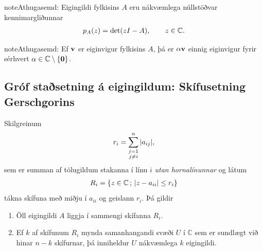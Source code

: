 \documentclass[letterpaper,10pt,icelandic]{sphinxmanual}
\begin{document}
\begin{notice}{note}{Athugasemd:}
Eigingildi fylkisins \(A\) eru nákvæmlega núllstöðvar
kennimargliðunnar
\begin{gather}
\begin{split}p_A(z)=\det(zI-A), \qquad z\in {{\mathbb  C}}.\end{split}\notag
\end{gather}\end{notice}

\begin{notice}{note}{Athugasemd:}
Ef \({\mbox{${\bf v}$}}\) er eiginvigur fylkisins
\(A\), þá er \(\alpha {\mbox{${\bf v}$}}\) einnig eiginvigur
fyrir sérhvert
\(\alpha\in {{\mathbb  C}}\setminus \{{\mbox{${\bf 0}$}}\}\).
\end{notice}


\subsection{Gróf staðsetning á eigingildum: Skífusetning Gerschgorins}
\label{kafli09:index-1}\label{kafli09:grof-stasetning-a-eigingildum-skifusetning-gerschgorins}
Skilgreinum
\begin{gather}
\begin{split}r_i=\sum\limits_{{\substack{j=1 \\ j\neq i}}}^n|a_{ij}|,\end{split}\notag
\end{gather}
sem er summan af tölugildum stakanna í línu \(i\) \emph{utan
hornalínunnar} og látum
\begin{gather}
\begin{split}R_i=\{z\in {{\mathbb  C}}\,;\, |z-a_{ii}|\leq r_i\}\end{split}\notag
\end{gather}
tákna skífuna með miðju í \(a_{ii}\) og geislann \(r_i\). Þá
gildir
\begin{enumerate}
\item {} 
Öll eigingildi \(A\) liggja í sammengi skífanna \(R_i\).

\item {} 
Ef \(k\) af skífunum \(R_i\) mynda samanhangandi svæði
\(U\) í \({{\mathbb  C}}\) sem er sundlægt við hinar
\(n-k\) skífurnar, þá inniheldur \(U\) nákvæmlega \(k\)
eigingildi.

\end{enumerate}
\end{document}
